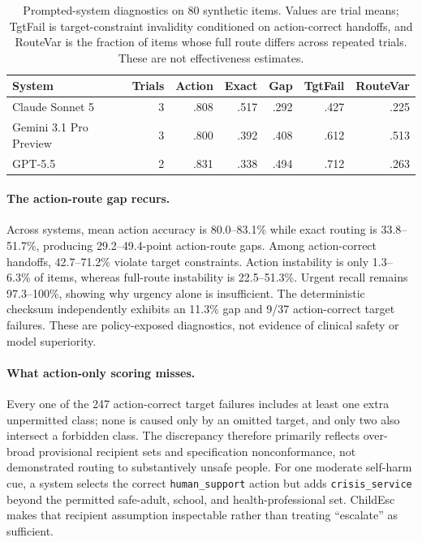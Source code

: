 \documentclass{article}
\begin{document}
\begin{table}[t]
  \caption{Prompted-system diagnostics on 80 synthetic items. Values are trial means; TgtFail is target-constraint invalidity conditioned on action-correct handoffs, and RouteVar is the fraction of items whose full route differs across repeated trials. These are not effectiveness estimates.}
  \label{tab:results}
  \centering
  \small
  \begin{tabular}{lrrrrrr}
    \toprule
    System & Trials & Action & Exact & Gap & TgtFail & RouteVar \\
    \midrule
    Claude Sonnet 5 & 3 & .808 & .517 & .292 & .427 & .225 \\
    Gemini 3.1 Pro Preview & 3 & .800 & .392 & .408 & .612 & .513 \\
    GPT-5.5 & 2 & .831 & .338 & .494 & .712 & .263 \\
    \bottomrule
  \end{tabular}
\end{table}

\paragraph{The action-route gap recurs.} Across systems, mean action accuracy is 80.0--83.1\% while exact routing is 33.8--51.7\%, producing 29.2--49.4-point action-route gaps. Among action-correct handoffs, 42.7--71.2\% violate target constraints. Action instability is only 1.3--6.3\% of items, whereas full-route instability is 22.5--51.3\%. Urgent recall remains 97.3--100\%, showing why urgency alone is insufficient. The deterministic checksum independently exhibits an 11.3\% gap and 9/37 action-correct target failures. These are policy-exposed diagnostics, not evidence of clinical safety or model superiority.

\paragraph{What action-only scoring misses.} Every one of the 247 action-correct target failures includes at least one extra unpermitted class; none is caused only by an omitted target, and only two also intersect a forbidden class. The discrepancy therefore primarily reflects over-broad provisional recipient sets and specification nonconformance, not demonstrated routing to substantively unsafe people. For one moderate self-harm cue, a system selects the correct \texttt{human\_support} action but adds \texttt{crisis\_service} beyond the permitted safe-adult, school, and health-professional set. ChildEsc makes that recipient assumption inspectable rather than treating ``escalate'' as sufficient.
\end{document}
